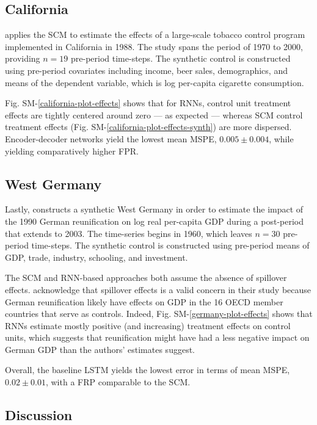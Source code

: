\documentclass[hidelinks,12pt]{article}
\begin{document}
\subsection{California} 

\citet{abadie2010synthetic} applies the SCM to estimate the effects of a large-scale tobacco control program implemented in California in 1988. The study spans the period of 1970 to 2000, providing $n=19$ pre-period time-steps.  The synthetic control is constructed using pre-period covariates including income, beer sales, demographics, and means of the dependent variable, which is log per-capita cigarette consumption. 

Fig. SM-\ref{california-plot-effects} shows that for RNNs, control unit treatment effects are tightly centered around zero --- as expected --- whereas SCM control treatment effects (Fig. SM-\ref{california-plot-effects-synth}) are more dispersed. Encoder-decoder networks yield the lowest mean MSPE, $0.005 \pm 0.004$, while yielding comparatively higher FPR.  

\subsection{West Germany} 

Lastly, \citet{abadie2015comparative} constructs a synthetic West Germany in order to estimate the impact of the 1990 German reunification on log real per-capita GDP during a post-period that extends to 2003. The time-series begins in 1960, which leaves $n=30$ pre-period time-steps. The synthetic control is constructed using pre-period means of GDP, trade, industry, schooling, and investment. 

The SCM and RNN-based approaches both assume the absence of spillover effects. \citet{abadie2015comparative} acknowledge that spillover effects is a valid concern in their study because German reunification likely have effects on GDP in the 16 OECD member countries that serve as controls. Indeed, Fig. SM-\ref{germany-plot-effects} shows that RNNs estimate mostly positive (and increasing) treatment effects on control units, which suggests that reunification might have had a less negative impact on German GDP than the authors' estimates suggest.

Overall, the baseline LSTM yields the lowest error in terms of mean MSPE, $0.02 \pm 0.01$, with a FRP comparable to the SCM.

\subsection{Discussion}
\end{document}
